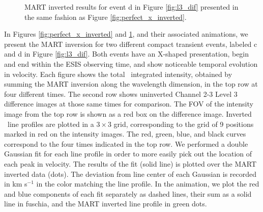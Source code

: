         \begin{figure}
    	\caption{MART inverted results for event d in Figure \ref{fig:l3_dif} presented in the same fashion as Figure \ref{fig:perfect_x_inverted}.}
    	\label{fig:other_x_inverted}
    	\end{figure}
    	
    	In Figures \ref{fig:perfect_x_inverted} and \ref{fig:other_x_inverted}, and their associated animations, we present the MART inversion for two different compact transient events, labeled c and d in Figure \ref{fig:l3_dif}.
    	Both events have an X-shaped presentation, begin and end within the ESIS observing time, and show noticeable temporal evolution in velocity.
		Each figure shows the total \ov \ integrated intensity, obtained by summing the MART inversion along the wavelength dimension, in the top row  at four different times. 
		The second row shows uninverted Channel 2-3 Level 3 difference images at those same times for comparison.
		The FOV of the intensity image from the top row is shown as a red box on the difference image.
		Inverted \ov\ line profiles are plotted in a $3\times 3$ grid, corresponding to the grid of 9 positions marked in red on the intensity images. The red, green, blue, and black curves correspond to the four times indicated in the top row.
		We performed a double Gaussian fit for each line profile in order to more easily pick out the location of each peak in velocity.
		The results of the fit (solid line) is plotted over the MART inverted data (dots).
		The deviation from line center of each Gaussian is recorded in km s$^{-1}$ in the color matching the line profile.
		In the animation, we plot the red and blue components of each fit separately as dashed lines, their sum as a solid line in fuschia, and the MART inverted line profile in  green dots.
		
